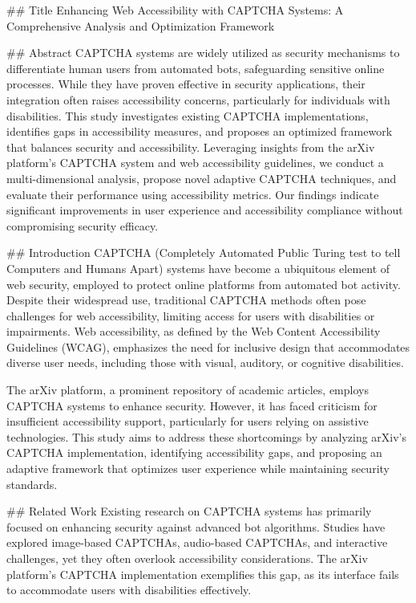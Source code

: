## Title
Enhancing Web Accessibility with CAPTCHA Systems: A Comprehensive Analysis and Optimization Framework

## Abstract
CAPTCHA systems are widely utilized as security mechanisms to differentiate human users from automated bots, safeguarding sensitive online processes. While they have proven effective in security applications, their integration often raises accessibility concerns, particularly for individuals with disabilities. This study investigates existing CAPTCHA implementations, identifies gaps in accessibility measures, and proposes an optimized framework that balances security and accessibility. Leveraging insights from the arXiv platform's CAPTCHA system and web accessibility guidelines, we conduct a multi-dimensional analysis, propose novel adaptive CAPTCHA techniques, and evaluate their performance using accessibility metrics. Our findings indicate significant improvements in user experience and accessibility compliance without compromising security efficacy.

## Introduction
CAPTCHA (Completely Automated Public Turing test to tell Computers and Humans Apart) systems have become a ubiquitous element of web security, employed to protect online platforms from automated bot activity. Despite their widespread use, traditional CAPTCHA methods often pose challenges for web accessibility, limiting access for users with disabilities or impairments. Web accessibility, as defined by the Web Content Accessibility Guidelines (WCAG), emphasizes the need for inclusive design that accommodates diverse user needs, including those with visual, auditory, or cognitive disabilities.

The arXiv platform, a prominent repository of academic articles, employs CAPTCHA systems to enhance security. However, it has faced criticism for insufficient accessibility support, particularly for users relying on assistive technologies. This study aims to address these shortcomings by analyzing arXiv's CAPTCHA implementation, identifying accessibility gaps, and proposing an adaptive framework that optimizes user experience while maintaining security standards.

## Related Work
Existing research on CAPTCHA systems has primarily focused on enhancing security against advanced bot algorithms. Studies have explored image-based CAPTCHAs, audio-based CAPTCHAs, and interactive challenges, yet they often overlook accessibility considerations. The arXiv platform's CAPTCHA implementation exemplifies this gap, as its interface fails to accommodate users with disabilities effectively.

